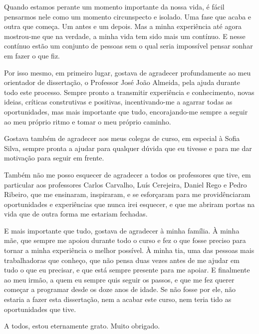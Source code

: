 \acknowledgements
Quando estamos perante um momento importante da nossa vida, é fácil pensarmos nele como um momento circunspecto e isolado. Uma fase que acaba e outra que começa. Um antes e um depois. Mas a minha experiência até agora mostrou-me que na verdade, a minha vida tem sido mais um contínuo. E nesse contínuo estão um conjunto de pessoas sem o qual seria impossível pensar sonhar em fazer o que fiz.

Por isso mesmo, em primeiro lugar, gostava de agradecer profundamente ao meu orientador de dissertação, o Professor José João Almeida, pela ajuda durante todo este processo. Sempre pronto a transmitir experiência e conhecimento, novas ideias, críticas construtivas e positivas, incentivando-me a agarrar todas as oportunidades, mas mais importante que tudo, encorajando-me sempre a seguir ao meu próprio ritmo e tomar o meu próprio caminho.

Gostava também de agradecer aos meus colegas de curso, em especial à Sofia Silva, sempre pronta a ajudar para qualquer dúvida que eu tivesse e para me dar motivação para seguir em frente.

Também não me posso esquecer de agradecer a todos os professores que tive, em particular aos professores Carlos Carvalho, Luís Cerejeira, Daniel Rego e Pedro Ribeiro, que me ensinaram, inspiraram, e se esforçaram para me providênciaram oportunidades e experiências que nunca irei esquecer, e que me abriram portas na vida que de outra forma me estariam fechadas.

E mais importante que tudo, gostava de agradecer à minha família. À minha mãe, que sempre me apoiou durante todo o curso e fez o que fosse preciso para tornar a minha experiência o melhor possível. À minha tia, uma das pessoas mais trabalhadoras que conheço, que não pensa duas vezes antes de me ajudar em tudo o que eu precisar, e que está sempre presente para me apoiar. E finalmente ao meu irmão, a quem eu sempre quis seguir os passos, e que me fez querer começar a programar desde os doze anos de idade. Se não fosse por ele, não estaria a fazer esta dissertação, nem a acabar este curso, nem teria tido as oportunidades que tive.

A todos, estou eternamente grato. Muito obrigado.
